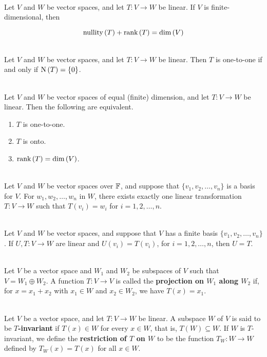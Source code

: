 \begin{theorem}
	\hfill\\
	Let $V$ and $W$ be vector spaces, and let $T: V \to W$ be linear. If $V$ is finite-dimensional, then
	
	\[\text{nullity}\left(T\right) + \text{rank}\left(T\right) = \text{dim}\left(V\right)\]
\end{theorem}

\begin{theorem}
	\hfill\\
	Let $V$ and $W$ be vector spaces, and let $T: V \to W$ be linear. Then $T$ is one-to-one if and only if $\text{N}\left(T\right) = \{0\}$.
\end{theorem}

\begin{theorem}\label{Theorem 2.5}
	\hfill\\
	Let $V$ and $W$ be vector spaces of equal (finite) dimension, and let $T: V \to W$ be linear. Then the following are equivalent.
	
	\begin{enumerate}
		\item $T$ is one-to-one.
		\item $T$ is onto.
		\item $\text{rank}\left(T\right) = \text{dim}\left(V\right)$.
	\end{enumerate}
\end{theorem}

\begin{theorem}
	\hfill\\
	Let $V$ and $W$ be vector spaces over $\mathbb{F}$, and suppose that $\{v_1, v_2, \dots, v_n\}$ is a basis for $V$. For $w_1, w_2, \dots, w_n$ in $W$, there exists exactly one linear transformation $T: V \to W$ such that $T(v_i) = w_i$ for $i = 1, 2, \dots, n$.
\end{theorem}

\begin{corollary}\label{Corollary 2.1}
	\hfill\\
	Let $V$ and $W$ be vector spaces, and suppose that $V$ has a finite basis $\{v_1, v_2, \dots, v_n\}$. If $U,T: V \to W$ are linear and $U(v_i) = T(v_i)$, for $i = 1, 2, \dots, n$, then $U = T$.
\end{corollary}

\begin{definition}
	\hfill\\
	Let $V$ be a vector space and $W_1$ and $W_2$ be subspaces of $V$ such that $V = W_1 \oplus W_2$. A function $T: V \to V$ is called the \textbf{projection on $W_1$ along $W_2$} if, for $x = x_1 + x_2$ with $x_1 \in W$ and $x_2 \in W_2$, we have $T(x) = x_1$.
\end{definition}

\begin{definition}
	\hfill\\
	Let $V$ be a vector space, and let $T: V \to W$ be linear. A subspace $W$ of $V$ is said to be \textbf{$T$-invariant} if $T(x) \in W$ for every $x \in W$, that is, $T(W) \subseteq W$. If $W$ is $T$-invariant, we define the \textbf{restriction of $T$ on $W$} to be the function $T_W: W \to W$ defined by $T_W(x) = T(x)$ for all $x \in W$.
\end{definition}